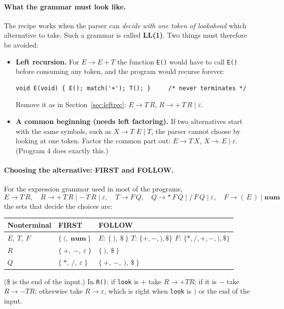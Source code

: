 \documentclass[11pt,a4paper]{article}
\newcommand{\tok}[1]{\ensuremath{\mathtt{#1}}}
\begin{document}
\paragraph{What the grammar must look like.} The recipe works when the parser can \emph{decide with one token of lookahead} which alternative to take. Such a grammar is called \textbf{LL(1)}. Two things must therefore be avoided:
\begin{itemize}[nosep]
\item \textbf{Left recursion.} For $E\to E+T$ the function \texttt{E()} would have to call \texttt{E()} before consuming any token, and the program would recurse forever:
\begin{lstlisting}[basicstyle=\ttfamily\footnotesize]
void E(void) { E(); match('+'); T(); }     /* never terminates */
\end{lstlisting}
Remove it as in Section~\ref{sec:leftrec}: $E\to T\,R$, $R\to+\,T\,R\mid\varepsilon$.
\item \textbf{A common beginning (needs left factoring).} If two alternatives start with the same symbols, such as $X\to T\,\hat{}\,E\mid T$, the parser cannot choose by looking at one token. Factor the common part out: $E\to T\,X$, $X\to\hat{}\,E\mid\varepsilon$. (Program 4 does exactly this.)
\end{itemize}

\paragraph{Choosing the alternative: FIRST and FOLLOW.} For the expression grammar used in most of the programs,
\[
E\to T\,R,\quad R\to +\,T\,R\mid -\,T\,R\mid\varepsilon,\quad T\to F\,Q,\quad Q\to *\,F\,Q\mid /\,F\,Q\mid\varepsilon,\quad F\to(\,E\,)\mid\mathbf{num}
\]
the sets that decide the choices are:
\begin{center}
\small
\begin{tabular}{@{}l l l@{}}
\toprule
\textbf{Nonterminal} & \textbf{FIRST} & \textbf{FOLLOW} \\ \midrule
$E,\ T,\ F$ & $\{\ \tok{(},\ \mathbf{num}\ \}$ & $E$: $\{\ \tok{)},\ \$\ \}$ \quad $T$: $\{+,-,\tok{)},\$\}$ \quad $F$: $\{*,/,+,-,\tok{)},\$\}$ \\
$R$ & $\{\ +,\ -,\ \varepsilon\ \}$ & $\{\ \tok{)},\ \$\ \}$ \\
$Q$ & $\{\ *,\ /,\ \varepsilon\ \}$ & $\{\ +,\ -,\ \tok{)},\ \$\ \}$ \\ \bottomrule
\end{tabular}
\end{center}
(\$ is the end of the input.) In \texttt{R()}: if \texttt{look} is $+$ take $R\to+TR$; if it is $-$ take $R\to-TR$; otherwise take $R\to\varepsilon$, which is right when \texttt{look} is $)$ or the end of the input.
\end{document}

